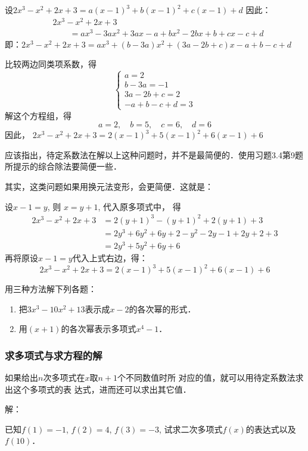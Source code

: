 \begin{solution}
设$2x^3-x^2+2x+3=a(x-1)^3+b(x-1)^2+c(x-1)+d$
因此：
\[\begin{split}
    &2x^3-x^2+2x+3\\
&\qquad =ax^3-3ax^2+3ax-a+bx^2-2bx+b+cx-c+d
\end{split}\]
即：$2x^3-x^2+2x+3 =ax^3+(b-3a)x^2+(3a-2b+c)x-a+b-c+d$

比较两边同类项系数，得
\[\begin{cases}
    a=2\\
    b-3a=-1\\
    3a-2b+c=2\\
    -a+b-c+d=3
\end{cases}\]
解这个方程组，得
\[a=2,\quad b=5,\quad c=6,\quad d=6\]
因此，
$2x^3-x^2+2x+3 =2(x-1)^3+5(x-1)^2+6(x-1)+6$
\end{solution}

应该指出，待定系数法在解以上这种问题时，并不是最简便的．使用习题3.4第9题所提示的综合除法要简便一些．

其实，这类问题如果用换元法变形，会更简便．这就是：

设$x-1=y$, 则
$x=y+1$, 代入原多项式中，
得
\[\begin{split}
    2x^3-x^2+2x+3&=2(y+1)^3-(y+1)^2+2(y+1)+3\\
&=2y^3+6y^2+6y+2-y^2-2y-1+2y+2+3\\
&=2y^3+5y^2+6y+6
\end{split}\]
再将原设$x-1=y$代入上式右边，得：
$$2x^3-x^2+2x+3=2(x-1)^3+5(x-1)^2+6(x-1)+6$$

\begin{ex}
    用三种方法解下列各题：
\begin{enumerate}
    \item 把$3x^3-10x^2+13$表示成$x-2$的各次幂的形式．
    \item 用$(x+1)$的各次幂表示多项式$x^4-1$． 
\end{enumerate}
\end{ex}

\subsubsection{求多项式与求方程的解}

如果给出$n$次多项式在$x$取$n+1$个不同数值时所
对应的值，就可以用待定系数法求出这个多项式的表
达式，进而还可以求出其它值．


解：


\begin{example}
    已知$f(1)=-1$, $f(2)=4$, $f(3)=-3$,
试求二次多项式$f(x)$的表达式以及$f(10)$．
\end{example}

